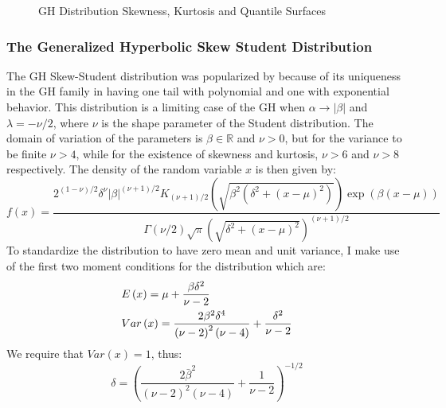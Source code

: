\begin{landscape}
\begin{figure}[!ht]
\caption[GH Distribution Skewness, Kurtosis and Quantile Surfaces]{GH Distribution Skewness, Kurtosis and Quantile Surfaces}\label{fig:ghsurface}
\end{figure}
\end{landscape}

\subsubsection{The Generalized Hyperbolic Skew Student Distribution}\label{ghskt}
The GH Skew-Student distribution was popularized by \cite{Aas2006} because of its uniqueness
in the GH family in having one tail with polynomial and one with exponential behavior.
This distribution is a limiting case of the GH when $\alpha  \to \left| \beta  \right|$
and $\lambda=-\nu/2$, where $\nu$ is the shape parameter of the Student distribution.
The domain of variation of the parameters is $\beta  \in \mathbb{R}$ and $\nu>0$, but
for the variance to be finite $\nu>4$, while for the existence of skewness and kurtosis,
$\nu>6$ and $\nu>8$ respectively. The density of the random variable $x$ is then given
by:
\begin{equation}
f\left( x \right) = \frac{{{2^{\left( {1 - \nu } \right)/2}}{\delta ^\nu }{{\left| \beta  \right|}^{\left( {\nu  + 1} \right)/2}}{K_{\left( {\nu  + 1} \right)/2}}\left( {\sqrt {{\beta ^2}\left( {{\delta ^2} + {{\left( {x - \mu } \right)}^2}} \right)} } \right)\exp \left( {\beta \left( {x - \mu } \right)} \right)}}
{{\Gamma \left( {\nu /2} \right)\sqrt \pi  {{\left( {\sqrt {{\delta ^2} + {{\left( {x - \mu } \right)}^2}} } \right)}^{\left( {\nu  + 1} \right)/2}}}}
\end{equation}
To standardize the distribution to have zero mean and unit variance, I make use
of the first two moment conditions for the distribution which are:
\begin{equation}
\begin{gathered}
  E\left( x \right) = \mu  + \frac{{\beta {\delta ^2}}}
{{\nu  - 2}} \hfill \\
  Var\left( x \right) = \frac{{2{\beta ^2}{\delta ^4}}}
{{{{\left( {\nu  - 2} \right)}^2}\left( {\nu  - 4} \right)}} + \frac{{{\delta ^2}}}
{{\nu  - 2}} \hfill \\
\end{gathered}
\end{equation}
We require that $Var(x)=1$, thus:
\begin{equation}
\delta  = {\left( {\frac{{2{{\bar \beta }^2}}}
{{{{\left( {\nu  - 2} \right)}^2}\left( {\nu  - 4} \right)}} + \frac{1}
{{\nu  - 2}}} \right)^{ - 1/2}}
\end{equation}
